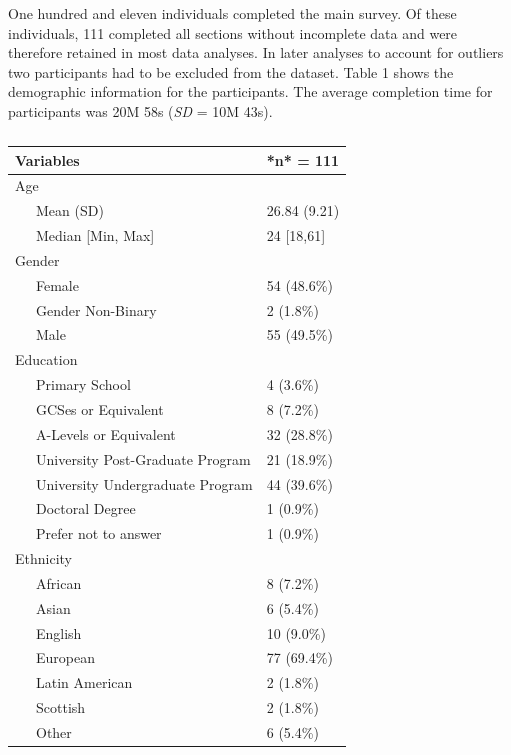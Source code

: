 \documentclass[
  english,
  a4paper,floatsintext]{apa7}
\begin{document}
One hundred and eleven individuals completed the main survey. Of these individuals, 111 completed all sections without incomplete data and were therefore retained in most data analyses. In later analyses to account for outliers two participants had to be excluded from the dataset. Table 1 shows the demographic information for the participants. The average completion time for participants was 20M 58s (\emph{SD} = 10M 43s).

\begin{table}[tbp]

\begin{center}
\begin{threeparttable}

\caption{\label{tab:unnamed-chunk-1}}

\small{

\begin{tabular}{ll}
\toprule
Variables & *n* = 111\\
\midrule
Age & \\
\ \ \ Mean (SD) & 26.84 (9.21)\\
\ \ \ Median [Min, Max] & 24 [18,61]\\
Gender & \\
\ \ \ Female & 54 (48.6\%)\\
\ \ \ Gender Non-Binary & 2 (1.8\%)\\
\ \ \ Male & 55 (49.5\%)\\
Education & \\
\ \ \ Primary School & 4 (3.6\%)\\
\ \ \ GCSes or Equivalent & 8 (7.2\%)\\
\ \ \ A-Levels or Equivalent & 32 (28.8\%)\\
\ \ \ University Post-Graduate Program & 21 (18.9\%)\\
\ \ \ University Undergraduate Program & 44 (39.6\%)\\
\ \ \ Doctoral Degree & 1 (0.9\%)\\
\ \ \ Prefer not to answer & 1 (0.9\%)\\
Ethnicity & \\
\ \ \ African & 8 (7.2\%)\\
\ \ \ Asian & 6 (5.4\%)\\
\ \ \ English & 10 (9.0\%)\\
\ \ \ European & 77 (69.4\%)\\
\ \ \ Latin American & 2 (1.8\%)\\
\ \ \ Scottish & 2 (1.8\%)\\
\ \ \ Other & 6 (5.4\%)\\
\bottomrule
\end{tabular}

}

\end{threeparttable}
\end{center}

\end{table}
\end{document}
